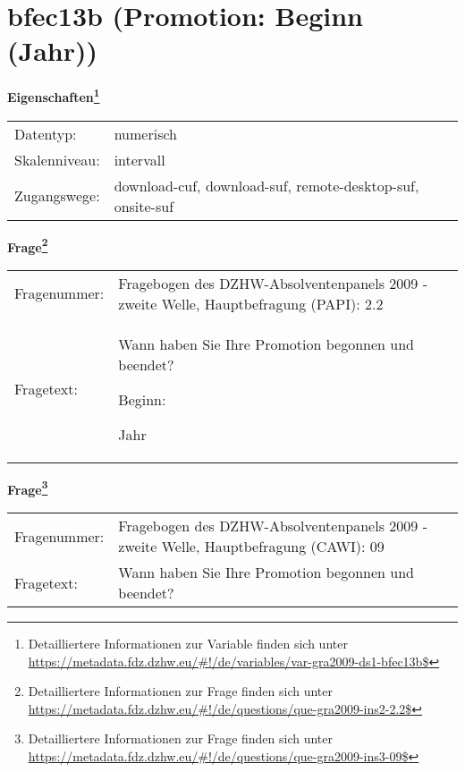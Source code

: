 
    \setcounter{footnote}{0}

    \vspace*{-1.8cm}
	\section{bfec13b (Promotion: Beginn (Jahr))}
	\label{section:bfec13b}



    \vspace*{0.5cm}
    \noindent\textbf{Eigenschaften\footnote{Detailliertere Informationen zur Variable finden sich unter
		\url{https://metadata.fdz.dzhw.eu/\#!/de/variables/var-gra2009-ds1-bfec13b$}}}\\
	\begin{tabularx}{\hsize}{@{}lX}
	Datentyp: & numerisch \\
	Skalenniveau: & intervall \\
	Zugangswege: &
	  download-cuf, 
	  download-suf, 
	  remote-desktop-suf, 
	  onsite-suf
 \\
    \end{tabularx}



				\vspace*{0.5cm}
                \noindent\textbf{Frage\footnote{Detailliertere Informationen zur Frage finden sich unter
		              \url{https://metadata.fdz.dzhw.eu/\#!/de/questions/que-gra2009-ins2-2.2$}}}\\
				\begin{tabularx}{\hsize}{@{}lX}
					Fragenummer: &
					  Fragebogen des DZHW-Absolventenpanels 2009 - zweite Welle, Hauptbefragung (PAPI):
					  2.2
 \\
					Fragetext: & Wann haben Sie Ihre Promotion begonnen und beendet?\par  Beginn:\par  Jahr \\
				\end{tabularx}
				\vspace*{0.5cm}
                \noindent\textbf{Frage\footnote{Detailliertere Informationen zur Frage finden sich unter
		              \url{https://metadata.fdz.dzhw.eu/\#!/de/questions/que-gra2009-ins3-09$}}}\\
				\begin{tabularx}{\hsize}{@{}lX}
					Fragenummer: &
					  Fragebogen des DZHW-Absolventenpanels 2009 - zweite Welle, Hauptbefragung (CAWI):
					  09
 \\
					Fragetext: & Wann haben Sie Ihre Promotion begonnen und beendet? \\
				\end{tabularx}





